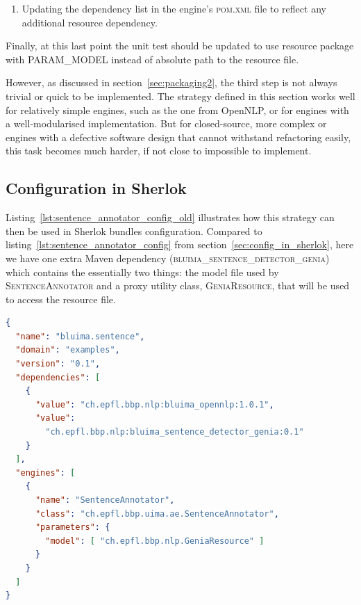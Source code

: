 \documentclass{article}
\newcommand{\ID}[1]{{\textsc{#1}}}
\begin{document}
\begin{appendices}
\begin{enumerate}
    \item Updating the dependency list in the engine's \ID{pom.xml} file to reflect any additional
        resource dependency.

\end{enumerate}

Finally, at this last point the unit test should be updated to use resource package with
\ID{PARAM\_MODEL} instead of absolute path to the resource file.

However, as discussed in section~\ref{sec:packaging2}, the third step is not always trivial or quick
to be implemented. The strategy defined in this section works well for relatively simple engines,
such as the one from OpenNLP, or for engines with a well-modularised implementation. But for
closed-source, more complex or engines with a defective software design that cannot withstand
refactoring easily, this task becomes much harder, if not close to impossible to implement.

\subsection{Configuration in Sherlok}

Listing~\ref{lst:sentence_annotator_config_old} illustrates how this strategy can then be used in
Sherlok bundles configuration. Compared to listing~\ref{lst:sentence_annotator_config} from
section~\ref{sec:config_in_sherlok}, here we have one extra Maven dependency
(\ID{bluima\_sentence\_detector\_genia}) which contains the essentially two things: the model file used
by \ID{SentenceAnnotator} and a proxy utility class, \ID{GeniaResource}, that will be used to access
the resource file.

\begin{lstlisting}[float,language=json,
                   caption=Configuration of \ID{SentenceAnnotator} in a Sherlok bundle with the
                   proxy-based packaging strategy,
                   label=lst:sentence_annotator_config_old]
{
  "name": "bluima.sentence",
  "domain": "examples",
  "version": "0.1",
  "dependencies": [
    {
      "value": "ch.epfl.bbp.nlp:bluima_opennlp:1.0.1",
      "value":
        "ch.epfl.bbp.nlp:bluima_sentence_detector_genia:0.1"
    }
  ],
  "engines": [
    {
      "name": "SentenceAnnotator",
      "class": "ch.epfl.bbp.uima.ae.SentenceAnnotator",
      "parameters": {
        "model": [ "ch.epfl.bbp.nlp.GeniaResource" ]
      }
    }
  ]
}
\end{lstlisting}

\end{appendices}
\end{document}
